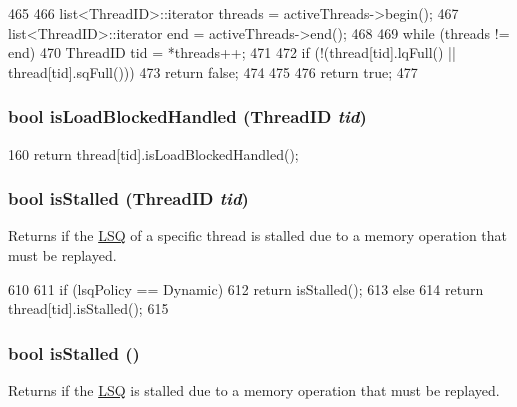 \begin{DoxyCode}
465 {
466     list<ThreadID>::iterator threads = activeThreads->begin();
467     list<ThreadID>::iterator end = activeThreads->end();
468 
469     while (threads != end) {
470         ThreadID tid = *threads++;
471 
472         if (!(thread[tid].lqFull() || thread[tid].sqFull()))
473             return false;
474     }
475 
476     return true;
477 }
\end{DoxyCode}
\hypertarget{classLSQ_a27440751be2f0a382983e7077342f2fe}{
\subsubsection[{isLoadBlockedHandled}]{\setlength{\rightskip}{0pt plus 5cm}bool isLoadBlockedHandled ({\bf ThreadID} {\em tid})}}
\label{classLSQ_a27440751be2f0a382983e7077342f2fe}



\begin{DoxyCode}
160     { return thread[tid].isLoadBlockedHandled(); }
\end{DoxyCode}
\hypertarget{classLSQ_a5532c6a5a314b05c9d29a319aa3a76a6}{
\subsubsection[{isStalled}]{\setlength{\rightskip}{0pt plus 5cm}bool isStalled ({\bf ThreadID} {\em tid})}}
\label{classLSQ_a5532c6a5a314b05c9d29a319aa3a76a6}
Returns if the \hyperlink{classLSQ}{LSQ} of a specific thread is stalled due to a memory operation that must be replayed. 


\begin{DoxyCode}
610 {
611     if (lsqPolicy == Dynamic)
612         return isStalled();
613     else
614         return thread[tid].isStalled();
615 }
\end{DoxyCode}
\hypertarget{classLSQ_af8eb8590fbfa6ecd2f796390677a4c00}{
\subsubsection[{isStalled}]{\setlength{\rightskip}{0pt plus 5cm}bool isStalled ()}}
\label{classLSQ_af8eb8590fbfa6ecd2f796390677a4c00}
Returns if the \hyperlink{classLSQ}{LSQ} is stalled due to a memory operation that must be replayed. 



